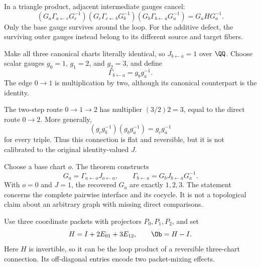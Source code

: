 In a triangle product, adjacent intermediate gauges cancel:
\[
(G_a\Gamma_{a\leftarrow c}G_c^{-1})
(G_c\Gamma_{c\leftarrow b}G_b^{-1})
(G_b\Gamma_{b\leftarrow a}G_a^{-1})
=G_aHG_a^{-1}.
\]
Only the base gauge survives around the loop. For the additive defect, the surviving outer gauges instead belong to its different source and target fibers.


Make all three canonical charts literally identical, so $J_{b\leftarrow a}=1$ over $\QQ$. Choose scalar gauges $g_0=1$, $g_1=2$, and $g_2=3$, and define
\[
\Gamma_{b\leftarrow a}=g_b g_a^{-1}.
\]
The edge $0\to1$ is multiplication by two, although its canonical counterpart is the identity.


The two-step route $0\to1\to2$ has multiplier $(3/2)2=3$, equal to the direct route $0\to2$. More generally,
\[
(g_cg_b^{-1})(g_bg_a^{-1})=g_cg_a^{-1}
\]
for every triple. Thus this connection is flat and reversible, but it is not calibrated to the original identity-valued $J$.

Choose a base chart $o$. The theorem constructs
\[
G_a=\Gamma_{a\leftarrow o}J_{o\leftarrow a},
\qquad
\Gamma_{b\leftarrow a}=G_bJ_{b\leftarrow a}G_a^{-1}.
\]
With $o=0$ and $J=1$, the recovered $G_a$ are exactly $1,2,3$. The statement concerns the complete pairwise interface and its cocycle. It is not a topological claim about an arbitrary graph with missing direct comparisons.


Use three coordinate packets with projectors $P_0,P_1,P_2$, and set
\[
H=I+2E_{01}+3E_{12},\qquad \Ob=H-I.
\]
Here $H$ is invertible, so it can be the loop product of a reversible three-chart connection. Its off-diagonal entries encode two packet-mixing effects.

